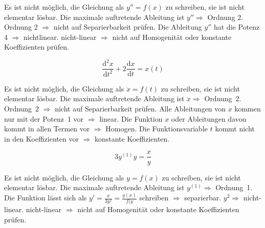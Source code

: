 \begin{outline}
    \1[a)] Es ist nicht möglich, die Gleichung als $y''=f(x)$ zu schreiben, sie
           ist nicht elementar lösbar.
    \1[b)] Die maximale auftretende Ableitung ist $y''\Rightarrow$ Ordnung 2.
        \2 Ordnung 2 $\Rightarrow$ nicht auf Separierbarkeit prüfen.
    \1[c)] Die Ableitung $y''$ hat die Potenz 4 $\Rightarrow$ nichtlinear.
        \2 nicht-linear $\Rightarrow$ nicht auf Homogenität oder konstante
           Koeffizienten prüfen.
\end{outline}

\begin{equation*}
    \frac{\text{d}^2x}{ \text{d} t ^{2}} + 2
    \frac{\text{d} x}{ \text{d} t } = x\left( t \right)
\end{equation*}

\begin{outline}
    \1[a)] Es ist nicht möglich, die Gleichung als $\ddot{x}=f(t)$ zu 
           schreiben, sie ist nicht elementar lösbar.
    \1[b)] Die maximale auftretende Ableitung ist $\ddot{x}\Rightarrow$ 
           Ordnung~2.
        \2 Ordnung~2 $\Rightarrow$ nicht auf Separierbarkeit prüfen.
    \1[c)] Alle Ableitungen von $x$ kommen nur mit der Potenz~1 vor
           $\Rightarrow$ linear.
        \2 Die Funktion $x$ oder Ableitungen davon kommt in allen Termen 
           vor $\Rightarrow$ Homogen.
        \2 Die Funktionsvariable $t$ kommt nicht in den Koeffizienten vor
           $\Rightarrow$ konstante Koeffizienten.
\end{outline}

\begin{equation*}
    3y^{(1)} y= \frac{x}{y}
\end{equation*}

\begin{outline}
    \1[a)] Es ist nicht möglich, die Gleichung als $y=f(x)$ zu schreiben, sie
       ist nicht elementar lösbar.
    \1[b)] Die maximale auftretende Ableitung ist $y^{(1)} \Rightarrow$ 
           Ordnung~1.
        \2 Die Funktion lässt sich als $y' = \frac{x}{3y^2}=\frac{g(x)}{f(y}$
            schreiben $\Rightarrow$ separierbar.
    \1[c)] $y^2 \Rightarrow$ nicht-linear.
        \2 nicht-linear $\Rightarrow$ nicht auf Homogenität oder konstante
           Koeffizienten prüfen.
\end{outline}
